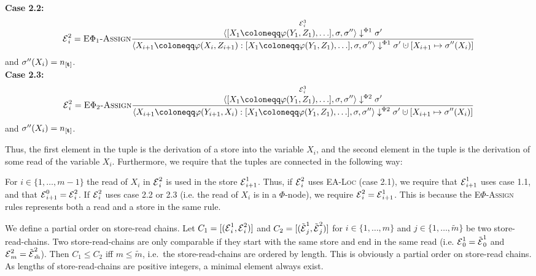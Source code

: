 \begin{definition}
\begin{align*}
    \end{align*}\\
    \textbf{Case 2.2:}\\
    \begin{align*}
        \E^2_i=\bsrule{E$\Phi_1$-Assign}
        {\overset{\E^3_i}{\bigsteppl{\defaultphilist}{\store}{\store''}{\store'}}}
        {\bigsteppl{\phistore{X_{i+1}}{X_i}{Z_{i+1}} : \defaultphilist}{\store}{\store''}{\storeassign{\store'}{X_{i+1} \mapsto \store''(X_i)}}}\\
    \end{align*} and $\store''(X_i) = \tracked{}$.\\
    \textbf{Case 2.3:}\\
    \begin{align*}
        \E^2_i=\bsrule{E$\Phi_2$-Assign}
        {\overset{\E^3_i}{\bigsteppr{\defaultphilist}{\store}{\store''}{\store'}}}
        {\bigsteppr{\phistore{X_{i+1}}{Y_{i+1}}{X_i} : \defaultphilist}{\store}{\store''}{\storeassign{\store'}{X_{i+1} \mapsto \store''(X_i)}}}\\
    \end{align*} and $\store''(X_i) = \tracked{}$.

    Thus, the first element in the tuple is the derivation of a store into the variable
    $X_i$, and the second element in the tuple is the derivation of some read of the 
    variable $X_i$.
    Furthermore, we require that the tuples are connected in the following way:
    
    For $i \in \{1, \ldots, m-1\}$ the read of $X_i$ in $\operatorname{\mathcal{E}}^2_i$ is used in the store
    $\operatorname{\mathcal{E}}^1_{i+1}$.
    Thus, if $\operatorname{\mathcal{E}}^2_i$ uses \textsc{EA-Loc} (case 2.1), we require that $\operatorname{\mathcal{E}}^1_{i+1}$ uses case 1.1,
    and that $\operatorname{\mathcal{E}}^0_{i+1} = \operatorname{\mathcal{E}}^2_i$.
    If $\operatorname{\mathcal{E}}^2_i$ uses case 2.2 or 2.3 (i.e. the read of $X_i$ is in a $\Phi$-node), we require
    $\operatorname{\mathcal{E}}^2_i = \operatorname{\mathcal{E}}^1_{i+1}$.
    This is because the \textsc{E$\Phi$-Assign} rules represents both a read and a store
    in the same rule.
\end{definition}

\begin{definition}
    We define a partial order on store-read chains.
    Let $C_1 = [(\operatorname{\mathcal{E}}^1_i, \operatorname{\mathcal{E}}^2_i)]$ and $C_2 = [(\tilde{\operatorname{\mathcal{E}}}^1_j, \tilde{\operatorname{\mathcal{E}}}^2_j)]$ for $i \in \{1, \ldots, m\}$ and
    $j \in \{1, \ldots, \tilde{m}\}$ be two store-read-chains.
    Two store-read-chains are only comparable if they start with the same store and 
    end in the same read (i.e. $\operatorname{\mathcal{E}}^1_0 = \tilde{\operatorname{\mathcal{E}}}^1_0$ and $\operatorname{\mathcal{E}}^2_m = \tilde{\operatorname{\mathcal{E}}}^2_{\tilde{m}}$).
    Then $C_1 \leq C_2$ iff $m \leq \tilde{m}$, i.e.\ the store-read-chains are ordered by length.
    This is obviously a partial order on store-read chains.
    As lengths of store-read-chains are positive integers, a minimal element always exist.
\end{definition}

